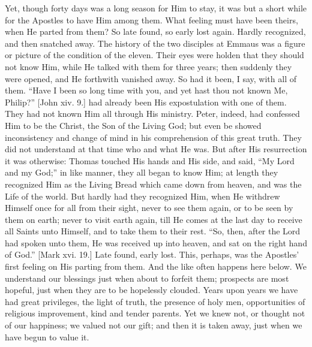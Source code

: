 Yet, though forty days was a long season for Him to stay, it was
but a short while for the Apostles to have Him among them. What
feeling must have been theirs, when He parted from them? So late
found, so early lost again. Hardly recognized, and then snatched away.
The history of the two disciples at Emmaus was a figure or picture of
the condition of the eleven. Their eyes were holden that they should
not know Him, while He talked with them for three years; then suddenly
they were opened, and He forthwith vanished away. So had it been, I
say, with all of them. ``Have I been so long time with you, and
yet hast thou not known Me, Philip?'' [John xiv. 9.] had already
been His expostulation with one of them. They had not known Him all
through His ministry. Peter, indeed, had confessed Him to be the
Christ, the Son of the Living God; but even be showed inconsistency
and change of mind in his comprehension of this great truth. They did
not understand at that time who and what He was. But after His
resurrection it was otherwise: Thomas touched His hands and His side,
and said, ``My Lord and my God;'' in like manner, they all
began to know Him; at length they recognized Him as the Living Bread
which came down from heaven, and was the Life of the world. But hardly
had they recognized Him, when He withdrew Himself once for all from
their sight, never to see them again, or to be seen by them on earth;
never to visit earth again, till He comes at the last day to receive
all Saints unto Himself, and to take them to their rest. ``So,
then, after the Lord had spoken unto them, He was received up into
heaven, and sat on the right hand of God.'' [Mark xvi. 19.] Late
found, early lost. This, perhaps, was the Apostles' first feeling on
His parting from them. And the like often happens here below. We
understand our blessings just when about to forfeit them; prospects
are most hopeful, just when they are to be hopelessly clouded. Years
upon years we have had great privileges, the light of truth, the
presence of holy men, opportunities of religious improvement, kind and
tender parents. Yet we knew not, or thought not of our happiness; we
valued not our gift; and then it is taken away, just when we have
begun to value it.

